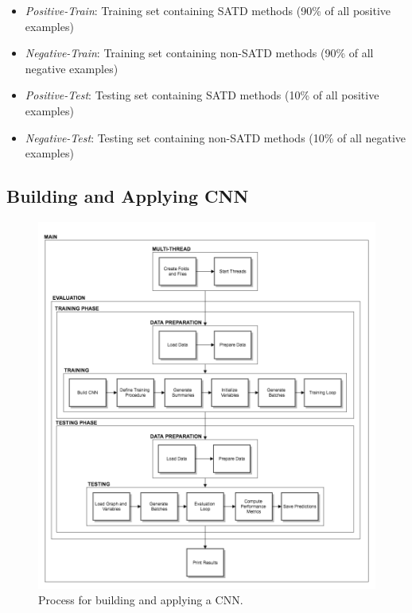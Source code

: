 \begin{itemize}
	\item \textit{Positive-Train}: Training set containing SATD methods (90\% of all positive examples)
	\item \textit{Negative-Train}: Training set containing non-SATD methods (90\% of all negative examples)
	\item \textit{Positive-Test}: Testing set containing SATD methods (10\% of all positive examples)
	\item \textit{Negative-Test}: Testing set containing non-SATD methods (10\% of all negative examples)
\end{itemize}

\subsection{Building and Applying CNN}


\begin{figure}[t]
	\centering
	\includegraphics[width=\linewidth]{figs/CNNProcess.png}
	\caption{Process for building and applying a CNN.}
	\label{fig:CNNProcess}
	\vspace{-4mm}
\end{figure}

